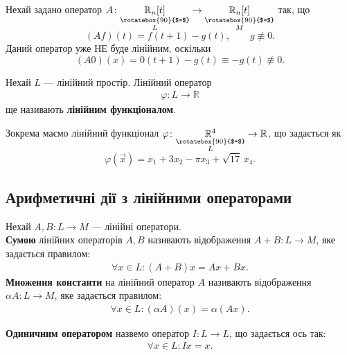 \documentclass{math_library}
\begin{document}
	\begin{example}
	Нехай задано оператор $A \colon \underset{\substack{\rotatebox{90}{$=$} \\ L}}{\mathbb{R}_n[t]} \to \underset{\substack{\rotatebox{90}{$=$} \\ M}}{\mathbb{R}_n[t]}$ так, що 
	\[
	(Af)(t) = f(t+1) - g(t),\qquad g \not\equiv 0.
	\] 
	Даний оператор уже НЕ буде лінійним, оскільки
	\[
	(A0)(x) = 0(t+1) - g(t) \equiv -g(t) \not\equiv 0.
	\]
	\end{example}
	
	\begin{definition}
	Нехай $L$ --- лінійний простір. Лінійний оператор
	\begin{align*}
	\varphi \colon L \to \mathbb{R}
	\end{align*}
	ще називають \textbf{лінійним функціоналом}.
	\end{definition}
	
	\begin{example}
	Зокрема маємо лінійний функціонал $\varphi \colon \underset{\substack{\rotatebox{90}{$=$} \\ L}}{\mathbb{R}^4} \to \mathbb{R}$, що задається як 
	\[
	\varphi(\vec{x}) = x_1 + 3x_2 - \pi x_3 + \sqrt{17}\,x_4.
	\]
	\end{example}
	
	\subsection{Арифметичні дії з лінійними операторами}
	\begin{definition}
	Нехай $A,B \colon L \to M$ --- лінійні оператори.\\
	\textbf{Сумою} лінійних операторів $A,B$ називають відображення $A+B \colon L \to M$, яке задається правилом:
	\begin{align*}
	\forall x \in L: (A+B)x = Ax+Bx.
	\end{align*}
	\textbf{Множення константи} на лінійний оператор $A$ називають відображення $\alpha A \colon L \to M$, яке задається правилом:
	\begin{align*}
	\forall x \in L: (\alpha A)(x) = \alpha (Ax).
	\end{align*}
	\end{definition}
	
	\begin{definition}
	\textbf{Одиничним оператором} назвемо оператор $I \colon L \to L$, що задається ось так:
	\begin{align*}
	\forall x \in L: Ix = x.
	\end{align*}
	\end{definition}
	
\end{document}
